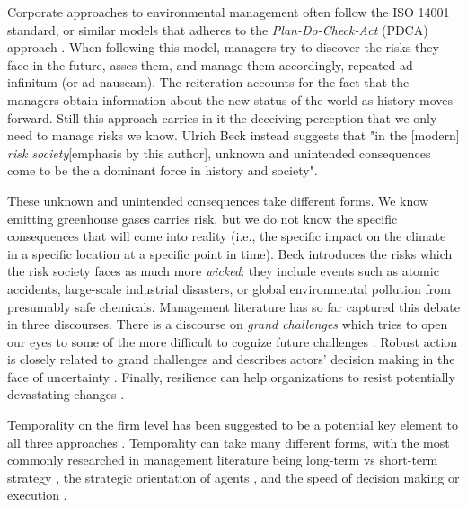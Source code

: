 Corporate approaches to environmental management often follow the ISO 14001 standard, or similar models that adheres to the \textit{Plan-Do-Check-Act} (PDCA) approach \citep{ISO2015}. When following this model, managers try to discover the risks they face in the future, asses them, and manage them accordingly, repeated ad infinitum (or ad nauseam). The reiteration accounts for the fact that the managers obtain information about the new status of the world as history moves forward. Still this approach carries in it the deceiving perception that we only need to manage risks we know. Ulrich Beck instead suggests that "in the [modern] \textit{risk society}[emphasis by this author], unknown and unintended consequences come to be the a dominant force in history and society"\citep[p. 22]{Beck1992}.

These unknown and unintended consequences take different forms. We know emitting greenhouse gases carries risk, but we do not know the specific consequences that will come into reality (i.e., the specific impact on the climate in a specific location at a specific point in time). Beck introduces the risks which the risk society faces as much more \textit{wicked}: they include events such as atomic accidents, large-scale industrial disasters, or global environmental pollution from presumably safe chemicals. Management literature has so far captured this debate in three discourses. There is a discourse on \textit{grand challenges} which tries to open our eyes to some of the more difficult to cognize future challenges \citep{George2016, Howard-Grenville2014}. Robust action is closely related to grand challenges and describes actors' decision making in the face of uncertainty \citep{Ferraro2015}. Finally, resilience can help organizations to resist potentially devastating changes \citep{VanderVegt2015, Flammer2017}.

Temporality on the firm level has been suggested to be a potential key element to all three approaches \citep{Bansal2014, Bansal2019, Kunisch2017}. Temporality can take many different forms, with the most commonly researched in management literature being long-term vs short-term strategy \citep{Flammer2017, Slawinski2015, Wang2012}, the strategic orientation of agents \citep{Souder2012, Wowak2015, Souder2010, Chen2017}, and the speed of decision making or execution \citep{Baum2003, Kownatzki2013, Dykes2019}. 

